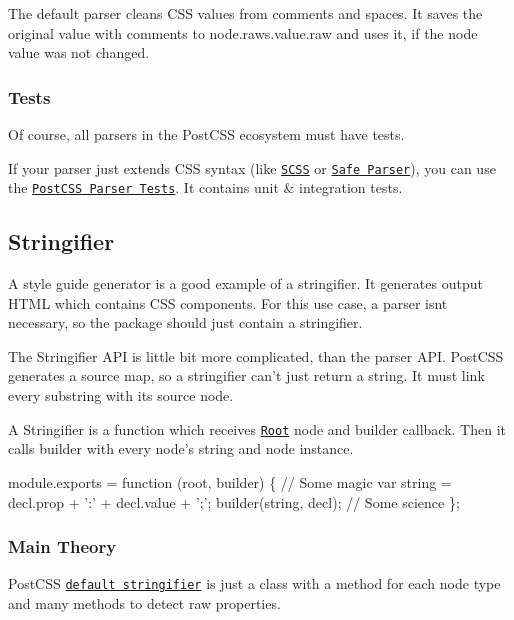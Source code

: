 The default parser cleans C\+SS values from comments and spaces. It saves the original value with comments to {\ttfamily node.\+raws.\+value.\+raw} and uses it, if the node value was not changed.

\subsubsection*{Tests}

Of course, all parsers in the Post\+C\+SS ecosystem must have tests.

If your parser just extends C\+SS syntax (like \href{https://github.com/postcss/postcss-scss}{\tt S\+C\+SS} or \href{https://github.com/postcss/postcss-safe-parser}{\tt Safe Parser}), you can use the \href{https://github.com/postcss/postcss-parser-tests}{\tt Post\+C\+SS Parser Tests}. It contains unit \& integration tests.

\subsection*{Stringifier}

A style guide generator is a good example of a stringifier. It generates output H\+T\+ML which contains C\+SS components. For this use case, a parser isn\textquotesingle{}t necessary, so the package should just contain a stringifier.

The Stringifier A\+PI is little bit more complicated, than the parser A\+PI. Post\+C\+SS generates a source map, so a stringifier can’t just return a string. It must link every substring with its source node.

A Stringifier is a function which receives \href{http://api.postcss.org/Root.html}{\tt {\ttfamily Root}} node and builder callback. Then it calls builder with every node’s string and node instance.


\begin{DoxyCode}
module.exports = function (root, builder) \{
    // Some magic
    var string = decl.prop + ':' + decl.value + ';';
    builder(string, decl);
    // Some science
\};
\end{DoxyCode}


\subsubsection*{Main Theory}

Post\+C\+SS \href{https://github.com/postcss/postcss/blob/master/lib/stringifier.es6}{\tt default stringifier} is just a class with a method for each node type and many methods to detect raw properties.


